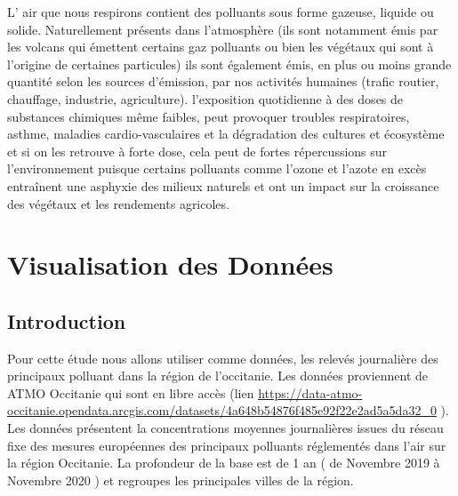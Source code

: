 \documentclass[a4paper,11pt,twoside,openright]{report}
\theoremstyle{plain}
\theoremstyle{definition}
\theoremstyle{remark}
\begin{document}
L' air que nous respirons contient des polluants sous forme gazeuse, liquide ou solide. Naturellement présents dans l’atmosphère (ils sont notamment émis par les volcans qui émettent certains gaz polluants ou bien les végétaux qui sont à l’origine de certaines particules) ils sont également émis, en plus ou moins grande quantité selon les sources d’émission, par nos activités humaines (trafic routier, chauffage, industrie, agriculture). l’exposition quotidienne à des doses de substances chimiques même faibles, peut provoquer troubles respiratoires, asthme, maladies cardio-vasculaires et la dégradation des cultures et écosystème et si on les retrouve à forte dose, cela peut de fortes répercussions sur l’environnement puisque certains polluants comme l’ozone et l’azote en excès entraînent une asphyxie des milieux naturels et ont un impact sur la croissance des végétaux et les rendements agricoles.

\tableofcontents
{}
\listoftables
{}
\clearpage


\pagestyle{fancy}


\chapter{Visualisation des Données}

\section{Introduction}
\label{sec:Introduction aux données }
Pour cette étude nous allons utiliser comme données, les relevés journalière des principaux polluant dans la région de l'occitanie. Les données proviennent de ATMO Occitanie qui sont en libre accès
(lien \url{ https://data-atmo-occitanie.opendata.arcgis.com/datasets/4a648b54876f485e92f22e2ad5a5da32_0} ). 
Les données présentent la concentrations moyennes journalières issues du réseau fixe des mesures européennes des principaux polluants réglementés dans l'air sur la région Occitanie. La profondeur de la base est de 1 an ( de Novembre 2019 à Novembre 2020 ) et regroupes les principales villes de la région.
\end{document}
